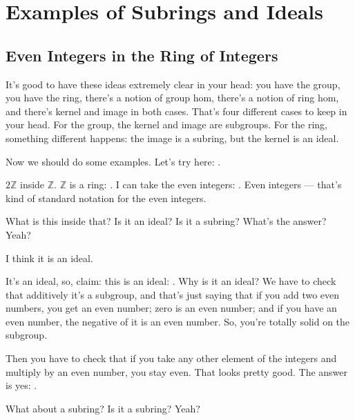 \section{Examples of Subrings and Ideals}

\subsection{Even Integers in the Ring of Integers}

\begin{speech}[00:39:53 - 00:40:57]
It's good to have these ideas extremely clear in your head: you have the group, you have the ring, there's a notion of group hom, there's a notion of ring hom, and there's kernel and image in both cases. That's four different cases to keep in your head. For the group, the kernel and image are subgroups. For the ring, something different happens: the image is a subring, but the kernel is an ideal.

Now we should do some examples. Let's try here: .

$2\mathbb{Z}$ inside $\mathbb{Z}$. $\mathbb{Z}$ is a ring: . I can take the even integers: . Even integers --- that's kind of standard notation for the even integers.

What is this inside that? Is it an ideal? Is it a subring? What's the answer? Yeah?
\end{speech}

\begin{student}
I think it is an ideal.
\end{student}

\begin{speech}[00:40:59 - 00:41:32]
It's an ideal, so, claim: this is an ideal: . Why is it an ideal? We have to check that additively it's a subgroup, and that's just saying that if you add two even numbers, you get an even number; zero is an even number; and if you have an even number, the negative of it is an even number. So, you're totally solid on the subgroup.

Then you have to check that if you take any other element of the integers and multiply by an even number, you stay even. That looks pretty good. The answer is yes: .

What about a subring? Is it a subring? Yeah?
\end{speech}

